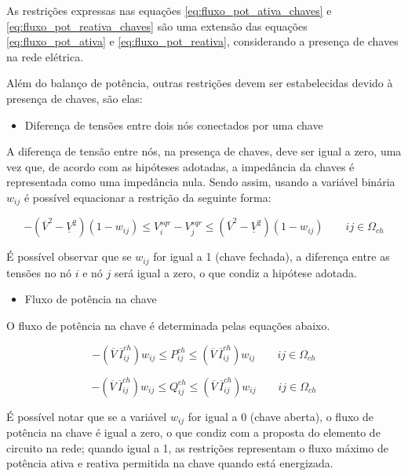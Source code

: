 As restrições expressas nas equações \ref{eq:fluxo_pot_ativa_chaves} e \ref{eq:fluxo_pot_reativa_chaves} são uma extensão das equações \ref{eq:fluxo_pot_ativa} e \ref{eq:fluxo_pot_reativa}, considerando a presença de chaves na rede elétrica.
    
Além do balanço de potência, outras restrições devem ser estabelecidas devido à presença de chaves, são elas:

\begin{itemize}
    \item Diferença de tensões entre dois nós conectados por uma chave
\end{itemize}

    
A diferença de tensão entre nós, na presença de chaves, deve ser igual a zero, uma vez que, de acordo com as hipóteses adotadas, a impedância da chaves é representada como uma impedância nula.
Sendo assim, usando a variável binária $w_{ij}$ é possível equacionar a restrição da seguinte forma:

\begin{equation}
    -(\overline{V}^{2} - \underline{V}^{2})(1-w_{ij}) \leq V_{i}^{sqr} - V_{j}^{sqr} \leq (\overline{V}^{2} - \underline{V}^{2})(1-w_{ij})\qquad ij\in\Omega_{ch}        
\end{equation}
    
É possível observar que se $w_{ij}$ for igual a 1 (chave fechada), a diferença entre as tensões no nó $i$ e nó $j$ será igual a zero, o que condiz a hipótese adotada.

\begin{itemize}
   \item Fluxo de potência na chave
\end{itemize} 
    
O fluxo de potência na chave é determinada pelas equações abaixo.
    
\begin{equation}
    -(\overline{V}\,\overline{I}_{ij}^{ch})w_{ij} \leq P_{ij}^{ch} \leq (\overline{V}\,\overline{I}_{ij}^{ch})w_{ij}\qquad ij\in\Omega_{ch}   
\end{equation}
    
    
\begin{equation}
    -(\overline{V}\,\overline{I}_{ij}^{ch})w_{ij} \leq Q_{ij}^{ch} \leq (\overline{V}\,\overline{I}_{ij}^{ch})w_{ij}\qquad ij\in\Omega_{ch}   
\end{equation}
    
É possível notar que se a variável $w_{ij}$ for igual a 0 (chave aberta), o fluxo de potência na chave é igual a zero, o que condiz com a proposta do elemento de circuito na rede; quando igual a 1, as restrições representam o fluxo máximo de potência ativa e reativa permitida na chave quando está energizada.

